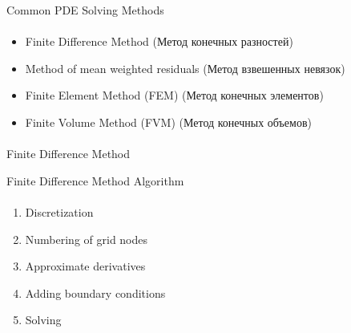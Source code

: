 \documentclass[aspectratio=169]{beamer}
\begin{document}
\begin{frame}[t]{Common PDE Solving Methods}
    \framesubtitle{}
    \begin{itemize}
        \item Finite Difference Method (Метод конечных разностей)
        \item Method of mean weighted residuals (Метод взвешенных невязок)
        \item Finite Element Method (FEM) (Метод конечных элементов)
        \item Finite Volume Method (FVM) (Метод конечных объемов)
    \end{itemize}
\end{frame}

\begin{frame}[c]{}
    \framesubtitle{}
        \centering \LARGE Finite Difference Method
\end{frame}

\begin{frame}[t]{Finite Difference Method Algorithm}
\framesubtitle{}
    \begin{enumerate}
        \item Discretization
        \item Numbering of grid nodes
        \item Approximate derivatives
        \item Adding boundary conditions
        \item Solving
    \end{enumerate}
\end{frame}
\end{document}

